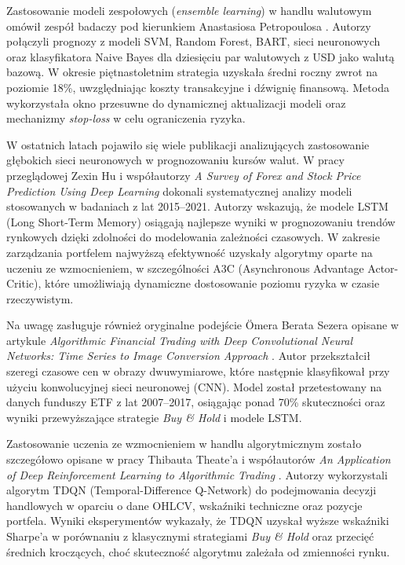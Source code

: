 Zastosowanie modeli zespołowych (\emph{ensemble learning}) w handlu walutowym omówił zespół badaczy pod kierunkiem Anastasiosa Petropoulosa \parencite{petro2017}. Autorzy połączyli prognozy z modeli SVM, Random Forest, BART, sieci neuronowych oraz klasyfikatora Naive Bayes dla dziesięciu par walutowych z USD jako walutą bazową. W okresie piętnastoletnim strategia uzyskała średni roczny zwrot na poziomie 18\%, uwzględniając koszty transakcyjne i dźwignię finansową. Metoda wykorzystała okno przesuwne do dynamicznej aktualizacji modeli oraz mechanizmy \emph{stop-loss} w celu ograniczenia ryzyka.

W ostatnich latach pojawiło się wiele publikacji analizujących zastosowanie głębokich sieci neuronowych w prognozowaniu kursów walut. W pracy przeglądowej Zexin Hu i współautorzy \textit{A Survey of Forex and Stock Price Prediction Using Deep Learning} \parencite{zexin2021} dokonali systematycznej analizy modeli stosowanych w badaniach z lat 2015–2021. Autorzy wskazują, że modele LSTM (Long Short-Term Memory) osiągają najlepsze wyniki w prognozowaniu trendów rynkowych dzięki zdolności do modelowania zależności czasowych. W zakresie zarządzania portfelem najwyższą efektywność uzyskały algorytmy oparte na uczeniu ze wzmocnieniem, w szczególności A3C (Asynchronous Advantage Actor-Critic), które umożliwiają dynamiczne dostosowanie poziomu ryzyka w czasie rzeczywistym.

Na uwagę zasługuje również oryginalne podejście Ömera Berata Sezera opisane w artykule \textit{Algorithmic Financial Trading with Deep Convolutional Neural Networks: Time Series to Image Conversion Approach} \parencite{sezer2018}. Autor przekształcił szeregi czasowe cen w obrazy dwuwymiarowe, które następnie klasyfikował przy użyciu konwolucyjnej sieci neuronowej (CNN). Model został przetestowany na danych funduszy ETF z lat 2007–2017, osiągając ponad 70\% skuteczności oraz wyniki przewyższające strategie \emph{Buy \& Hold} i modele LSTM.

Zastosowanie uczenia ze wzmocnieniem w handlu algorytmicznym zostało szczegółowo opisane w pracy Thibauta Theate’a i współautorów \textit{An Application of Deep Reinforcement Learning to Algorithmic Trading} \parencite{theate2021}. Autorzy wykorzystali algorytm TDQN (Temporal-Difference Q-Network) do podejmowania decyzji handlowych w oparciu o dane OHLCV, wskaźniki techniczne oraz pozycje portfela. Wyniki eksperymentów wykazały, że TDQN uzyskał wyższe wskaźniki Sharpe’a w porównaniu z klasycznymi strategiami \emph{Buy \& Hold} oraz przecięć średnich kroczących, choć skuteczność algorytmu zależała od zmienności rynku.

